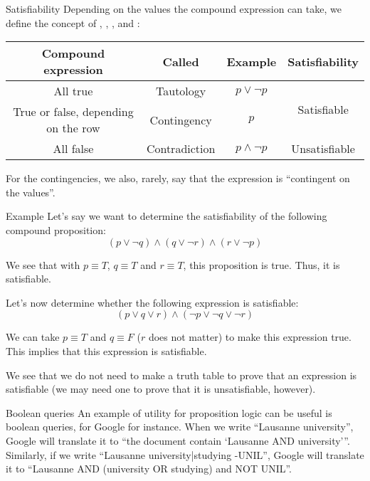 \documentclass{article}
\begin{document}
\begin{parag}{Satisfiability}
    Depending on the values the compound expression can take, we define the concept of , , ,  and :

    \begin{center}
    \begin{tabular}{|c|c|c|c|}
       \hline
       \textbf{Compound expression} & \textbf{Called} & \textbf{Example} & \textbf{Satisfiability} \\
       \hline
       All true & Tautology & $p \lor \lnot p$ & \multirow{2}{*}{Satisfiable}\\
       \cline{1-3}
       True or false, depending on the row & Contingency & $p$ & \\
       \hline
       All false & Contradiction & $p \land \lnot p$ & Unsatisfiable  \\
       \hline
    \end{tabular}
    \end{center}

    For the contingencies, we also, rarely, say that the expression is ``contingent on the values''.
\end{parag}

\begin{parag}{Example}
    Let's say we want to determine the satisfiability of the following compound proposition: 
    \[\left(p \lor \lnot q\right) \land \left(q \lor \lnot r\right) \land \left(r \lor \lnot p\right)\]
    
    We see that with $p \equiv T$, $q \equiv T$ and $r \equiv T$, this proposition is true. Thus, it is satisfiable.

    Let's now determine whether the following expression is satisfiable: 
    \[\left(p \lor q \lor r\right) \land \left(\lnot p \lor \lnot q \lor \lnot r\right)\]
    
    We can take $p \equiv T$ and $q \equiv F$ ($r$ does not matter) to make this expression true. This implies that this expression is satisfiable.

    We see that we do not need to make a truth table to prove that an expression is satisfiable (we may need one to prove that it is unsatisfiable, however).
\end{parag}

\begin{parag}{Boolean queries}
    An example of utility for proposition logic can be useful is boolean queries, for Google for instance. When we write ``Lausanne university'', Google will translate it to ``the document contain `Lausanne AND university'{}''. Similarly, if we write ``Lausanne university|studying -UNIL'', Google will translate it to ``Lausanne AND (university OR studying) and NOT UNIL''.
\end{parag}
\end{document}
